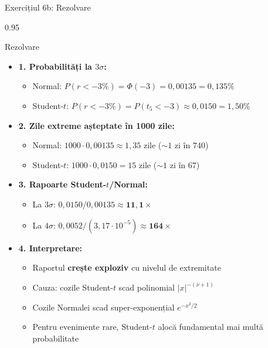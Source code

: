 \documentclass[9pt, aspectratio=169, t]{beamer}
\begin{document}
\begin{frame}[shrink=25]{Exercițiul 6b: Rezolvare}
\begin{cminipage}{0.95\textwidth}
\begin{exampleblock}{Rezolvare}
\begin{itemize}\setlength{\itemsep}{0pt}
    \item \textbf{1. Probabilități la $3\sigma$:}
    \begin{itemize}\setlength{\itemsep}{0pt}
        \item Normal: $P(r < -3\%) = \Phi(-3) = 0{,}00135 = 0{,}135\%$
        \item Student-$t$: $P(r < -3\%) = P(t_5 < -3) \approx 0{,}0150 = 1{,}50\%$
    \end{itemize}
    \item \textbf{2. Zile extreme așteptate în 1000 zile:}
    \begin{itemize}\setlength{\itemsep}{0pt}
        \item Normal: $1000 \cdot 0{,}00135 \approx 1{,}35$ zile ($\sim 1$ zi în $740$)
        \item Student-$t$: $1000 \cdot 0{,}0150 = 15$ zile ($\sim 1$ zi în $67$)
    \end{itemize}
    \item \textbf{3. Rapoarte Student-$t$/Normal:}
    \begin{itemize}\setlength{\itemsep}{0pt}
        \item La $3\sigma$: $0{,}0150/0{,}00135 \approx \mathbf{11{,}1\times}$
        \item La $4\sigma$: $0{,}0052/(3{,}17 \cdot 10^{-5}) \approx \mathbf{164\times}$
    \end{itemize}
    \item \textbf{4. Interpretare:}
    \begin{itemize}\setlength{\itemsep}{0pt}
        \item Raportul \textbf{crește exploziv} cu nivelul de extremitate
        \item Cauza: cozile Student-$t$ scad polinomial $|x|^{-(\nu+1)}$
        \item Cozile Normalei scad super-exponențial $e^{-x^2/2}$
        \item Pentru evenimente rare, Student-$t$ alocă fundamental mai multă probabilitate
    \end{itemize}
\end{itemize}
\end{exampleblock}
\end{cminipage}
\end{frame}
\end{document}
